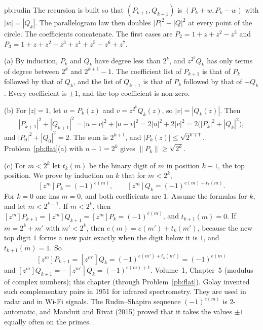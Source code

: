 \begin{solution}{pb:rudin}
\idea The recursion is built so that $(P_{k+1},Q_{k+1})$ is $(P_k+w,P_k-w)$ with $|w|=|Q_k|$. The parallelogram law then doubles $|P|^2+|Q|^2$ at every point of the circle. The coefficients concatenate. The first cases are $P_2=1+z+z^2-z^3$ and $P_3=1+z+z^2-z^3+z^4+z^5-z^6+z^7$.

\writeup (a) By induction, $P_k$ and $Q_k$ have degree less than $2^k$, and $z^{2^k}Q_k$ has only terms of degree between $2^k$ and $2^{k+1}-1$. The coefficient list of $P_{k+1}$ is that of $P_k$ followed by that of $Q_k$, and the list of $Q_{k+1}$ is that of $P_k$ followed by that of $-Q_k$. Every coefficient is $\pm1$, and the top coefficient is non-zero.

(b) For $|z|=1$, let $u=P_k(z)$ and $v=z^{2^k}Q_k(z)$, so $|v|=|Q_k(z)|$. Then
\[
|P_{k+1}|^2+|Q_{k+1}|^2=|u+v|^2+|u-v|^2=2|u|^2+2|v|^2=2\bigl(|P_k|^2+|Q_k|^2\bigr),
\]
and $|P_0|^2+|Q_0|^2=2$. The sum is $2^{k+1}$, and $|P_k(z)|\le\sqrt{2^{k+1}}$. Problem~\ref{pb:flat}(a) with $n+1=2^k$ gives $\|P_k\|\ge\sqrt{2^k}$.

(c) For $m<2^k$ let $t_k(m)$ be the binary digit of $m$ in position $k-1$, the top position. We prove by induction on $k$ that for $m<2^k$,
\[
[z^m]P_k=(-1)^{e(m)},\qquad[z^m]Q_k=(-1)^{e(m)+t_k(m)}.
\]
For $k=0$ one has $m=0$, and both coefficients are $1$. Assume the formulas for $k$, and let $m<2^{k+1}$. If $m<2^k$, then $[z^m]P_{k+1}=[z^m]Q_{k+1}=[z^m]P_k=(-1)^{e(m)}$, and $t_{k+1}(m)=0$. If $m=2^k+m'$ with $m'<2^k$, then $e(m)=e(m')+t_k(m')$, because the new top digit $1$ forms a new pair exactly when the digit below it is $1$, and $t_{k+1}(m)=1$. So
\[
[z^m]P_{k+1}=[z^{m'}]Q_k=(-1)^{e(m')+t_k(m')}=(-1)^{e(m)}
\]
and $[z^m]Q_{k+1}=-[z^{m'}]Q_k=(-1)^{e(m)+1}$.
\tools Volume~1, Chapter~5 (modulus of complex numbers); this chapter (through Problem~\ref{pb:flat}).
\leads Golay invented such complementary pairs in 1951 for infrared spectrometry. They are used in radar and in Wi-Fi signals. The Rudin--Shapiro sequence $(-1)^{e(m)}$ is $2$-automatic, and Mauduit and Rivat (2015) proved that it takes the values $\pm1$ equally often on the primes.
\end{solution}

